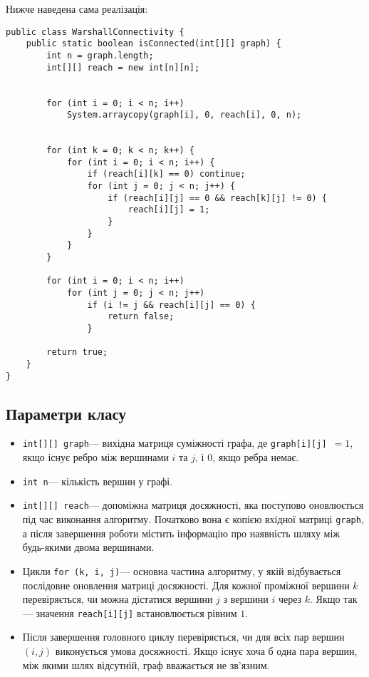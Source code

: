 \documentclass[12pt,a4paper]{article}
\begin{document}
Нижче наведена сама реалізація:
\begin{lstlisting}[style=javastyle]
public class WarshallConnectivity {
    public static boolean isConnected(int[][] graph) {
        int n = graph.length;
        int[][] reach = new int[n][n];

    
        for (int i = 0; i < n; i++) 
            System.arraycopy(graph[i], 0, reach[i], 0, n);

    
        for (int k = 0; k < n; k++) {
            for (int i = 0; i < n; i++) {
                if (reach[i][k] == 0) continue;
                for (int j = 0; j < n; j++) {
                    if (reach[i][j] == 0 && reach[k][j] != 0) {
                        reach[i][j] = 1;
                    }
                }
            }
        }

        for (int i = 0; i < n; i++)
            for (int j = 0; j < n; j++)
                if (i != j && reach[i][j] == 0) {
                    return false;
                }

        return true;
    }
}

\end{lstlisting}

\subsection{Параметри класу}
\begin{itemize}
    \item \texttt{int[][] graph}--- вихідна матриця суміжності графа, 
    де \texttt{graph[i][j] $= 1$}, якщо існує ребро між вершинами $i$ та $j$, 
    і \texttt{$0$}, якщо ребра немає. 

    \item \texttt{int n}--- кількість вершин у графі. 

    \item \texttt{int[][] reach}--- допоміжна матриця досяжності, 
    яка поступово оновлюється під час виконання алгоритму. 
    Початково вона є копією вхідної матриці \texttt{graph}, 
    а після завершення роботи містить інформацію про наявність шляху 
    між будь-якими двома вершинами.

    \item Цикли \texttt{for (k, i, j)}--- основна частина алгоритму, 
    у якій відбувається послідовне оновлення матриці досяжності. 
    Для кожної проміжної вершини $k$ перевіряється, 
    чи можна дістатися вершини $j$ з вершини $i$ через $k$. 
    Якщо так — значення \texttt{reach[i][j]} встановлюється рівним $1$.

    \item Після завершення головного циклу перевіряється, 
    чи для всіх пар вершин $(i,j)$ виконується умова досяжності. 
    Якщо існує хоча б одна пара вершин, між якими шлях відсутній, 
    граф вважається не зв’язним.
\end{itemize}
\end{document}
